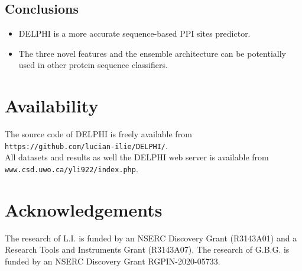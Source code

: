 \documentclass[a0,portrait]{a0poster}
\begin{document}
\begin{multicols}{2}
\begin{mdframed}[linewidth=7pt]
\begin{minipage}[b]{0.48\linewidth}
\end{minipage}
\end{mdframed}

\begin{mdframed}[linewidth=7pt]

\vspace*{-30pt}
\section*{\color{NavyBlue}Conclusions}
\begin{itemize}
  \item DELPHI is a more accurate sequence-based PPI sites predictor.
  \item The three novel features and the ensemble architecture can be potentially used in other protein sequence classifiers. 
\end{itemize}
\end{mdframed}
\begin{mdframed}[linewidth=7pt]
\color{DarkSlateGray} %
\footnotesize{

\vspace*{-20pt}
\section*{Availability} 
The source code of DELPHI is freely available from \texttt{https://github.com/lucian-ilie/DELPHI/}.\\
All datasets and results as well the DELPHI web server is available from \texttt{www.csd.uwo.ca/\texttildelow{}yli922/index.php}.
\vspace*{-20pt}
\nocite{*} %
\vspace*{-30pt}
\section*{Acknowledgements}
The research of L.I. is funded by an NSERC Discovery Grant (R3143A01) and a Research Tools and Instruments Grant (R3143A07). The research of G.B.G. is funded by an NSERC Discovery Grant RGPIN-2020-05733.
}
\end{mdframed}
\end{multicols}
\end{document}
